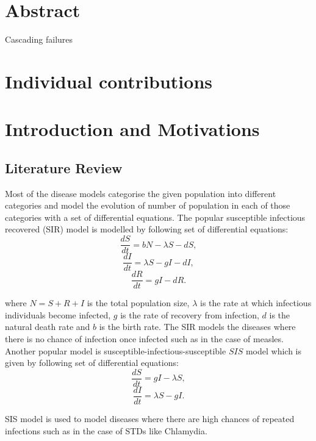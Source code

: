 \documentclass[11pt]{article}
\begin{document}

\tableofcontents

\newpage


\section{Abstract}
Cascading failures 

\section{Individual contributions}

\section{Introduction and Motivations}

\subsection{Literature Review}
Most of the disease models categorise the given population into different categories and model the evolution of number of population in each of those categories with a set of differential equations. The popular susceptible infectious recovered (SIR) model is modelled by following set of differential equations:
\[ \frac{dS}{dt} = bN - \lambda S - dS,  \]
\[ \frac{dI}{dt} = \lambda S - gI - dI, \]
\[ \frac{dR}{dt} = gI - dR. \]

where $N = S + R + I$ is the total population size, $\lambda$ is the rate at which infectious individuals become infected, $g$ is the rate of recovery from infection, $d$ is the natural death rate and $b$ is the birth rate. The SIR models the diseases where there is no chance of infection once infected such as in the case of measles. Another popular model is susceptible-infectious-susceptible $SIS$ model which is given by following set of differential equations:
\[ \frac{dS}{dt} = gI - \lambda S,  \]
\[ \frac{dI}{dt} = \lambda S - gI. \]

SIS model is used to model diseases where there are high chances of repeated infections such as in the case of STDs like Chlamydia.
\end{document}
